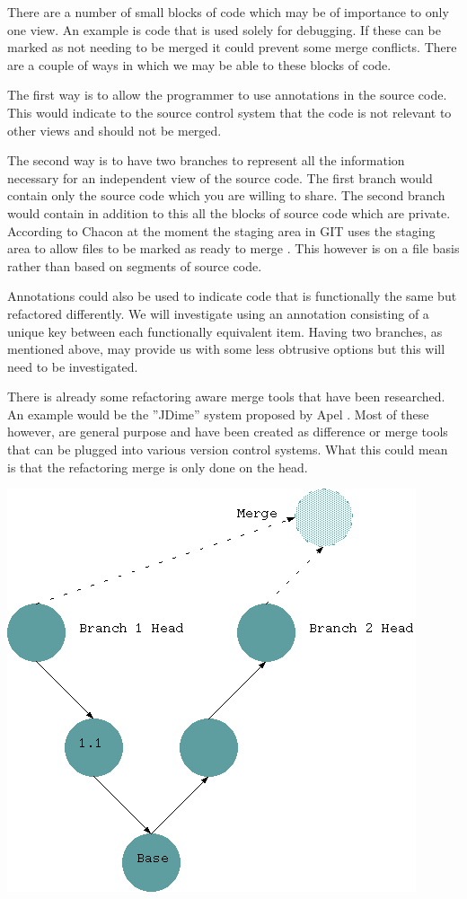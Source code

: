 \documentclass[12pt]{CRPITStyle}
\renewcommand{\cite}{\citep}
\begin{document}
There are a number of small blocks of code which may be of importance to only one view. An example is code that is used solely for debugging. If these can be marked as not needing to be merged it could prevent some merge conflicts. There are a couple of ways in which we may be able to these blocks of code.

The first way is to allow the programmer to use annotations in the source code. This would indicate to the source control system that the code is not relevant to other views and should not be merged.

The second way is to have two branches to represent all the information necessary for an independent view of the source code. The first branch would contain only the source code which you are willing to share. The second branch would contain in addition to this all the blocks of source code which are private. According to Chacon at the moment the staging area in GIT uses the staging area to allow files to be marked as ready to merge \cite{Chacon2009}. This however is on a file basis rather than based on segments of source code.

Annotations could also be used to indicate code that is functionally the same but refactored differently. We will investigate using an annotation consisting of a unique key between each functionally equivalent item. Having two branches, as mentioned above, may provide us with some less obtrusive options but this will need to be investigated.

There is already some refactoring aware merge tools that have been researched. An example would be the ''JDime'' system proposed by Apel \cite{Apel2011}. Most of these however, are general purpose and have been created as difference or merge tools that can be plugged into various version control systems. What this could mean is that the refactoring merge is only done on the head.

\begin{center}
\includegraphics[scale=0.5]{git-diag2}
\end{center}
\end{document}
